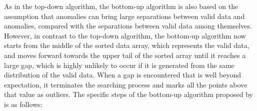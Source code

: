 \documentclass{monashthesis}
\theoremstyle{definition}
\theoremstyle{definition}
\theoremstyle{definition}
\theoremstyle{remark}
\begin{document}
As in the top-down algorithm, the bottom-up algorithm is also based on the assumption that anomalies can bring large separations between valid data and anomalies, compared with the separations between valid data among themselves. However, in contrast to the top-down algorithm, the bottom-up algorithm now starts from the middle of the sorted data array, which represents the valid data, and moves forward towards the upper tail of the sorted array until it reaches a large gap, which is highly unlikely to occur if it is generated from the same distribution of the valid data. When a gap is encountered that is well beyond expectation, it terminates the searching process and marks all the points above that value as outliers. The specific steps of the bottom-up algorithm proposed by \textcite{schwarz2008wind} is as follows:
\end{document}
